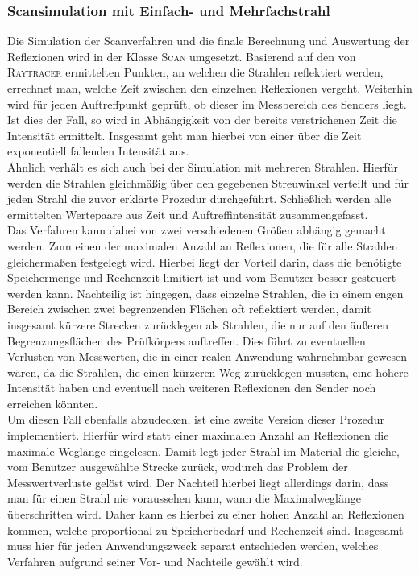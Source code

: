 \documentclass[reducespace,stylepage,semiarbeit]{spezidoc}
\begin{document}
\subsubsection{Scansimulation mit Einfach- und Mehrfachstrahl} %
Die Simulation der Scanverfahren und die finale Berechnung und Auswertung der Reflexionen wird in der Klasse \textsc{Scan} umgesetzt.
Basierend auf den von \textsc{Raytracer} ermittelten Punkten, an welchen die Strahlen reflektiert werden, errechnet man, welche Zeit zwischen den einzelnen Reflexionen vergeht.
Weiterhin wird für jeden Auftreffpunkt geprüft, ob dieser im Messbereich des Senders liegt. 
Ist dies der Fall, so wird in Abhängigkeit von der bereits verstrichenen Zeit die Intensität ermittelt. 
Insgesamt geht man hierbei von einer über die Zeit exponentiell fallenden Intensität aus.\\
Ähnlich verhält es sich auch bei der Simulation mit mehreren Strahlen. 
Hierfür werden die Strahlen gleichmäßig über den gegebenen Streuwinkel verteilt und für jeden Strahl die zuvor erklärte Prozedur durchgeführt. 
Schließlich werden alle ermittelten Wertepaare aus Zeit und Auftreffintensität zusammengefasst.\\
Das Verfahren kann dabei von zwei verschiedenen Größen abhängig gemacht werden. 
Zum einen der maximalen Anzahl an Reflexionen, die für alle Strahlen gleichermaßen festgelegt wird. Hierbei liegt der Vorteil darin, dass die benötigte Speichermenge und Rechenzeit limitiert ist und vom Benutzer besser gesteuert werden kann. 
Nachteilig ist hingegen, dass einzelne Strahlen, die in einem engen Bereich zwischen zwei begrenzenden Flächen oft reflektiert werden, damit insgesamt kürzere Strecken zurücklegen als Strahlen, die nur auf den äußeren Begrenzungsflächen des Prüfkörpers auftreffen.
Dies führt zu eventuellen Verlusten von Messwerten, die in einer realen Anwendung wahrnehmbar gewesen wären, da die Strahlen, die einen kürzeren Weg zurücklegen mussten, eine höhere Intensität haben und eventuell nach weiteren Reflexionen den Sender noch erreichen könnten.\\
Um diesen Fall ebenfalls abzudecken, ist eine zweite Version dieser Prozedur implementiert. 
Hierfür wird statt einer maximalen Anzahl an Reflexionen die maximale Weglänge eingelesen. 
Damit legt jeder Strahl im Material die gleiche, vom Benutzer ausgewählte Strecke zurück, wodurch das Problem der Messwertverluste gelöst wird. 
Der Nachteil hierbei liegt allerdings darin, dass man für einen Strahl nie voraussehen kann, wann die Maximalweglänge überschritten wird. 
Daher kann es hierbei zu einer hohen Anzahl an Reflexionen kommen, welche proportional zu Speicherbedarf und Rechenzeit sind. 
Insgesamt muss hier für jeden Anwendungszweck separat entschieden werden, welches Verfahren aufgrund seiner Vor- und Nachteile gewählt wird.\\
\end{document}
